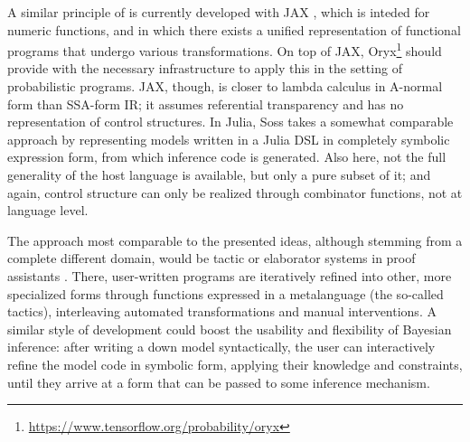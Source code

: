 A similar principle of is currently developed with JAX \parencite{bradbury2018jax}, which is inteded
for numeric functions, and in which there exists a unified representation of functional programs
that undergo various transformations.  On top of JAX,
Oryx\footnote{\protect\url{https://www.tensorflow.org/probability/oryx}} should provide with the
necessary infrastructure to apply this in the setting of probabilistic programs.  JAX, though, is
closer to lambda calculus in A-normal form than SSA-form IR; it assumes referential transparency and
has no representation of control structures.  In Julia, Soss \parencite{scherrer2019soss} takes a
somewhat comparable approach by representing models written in a Julia DSL in completely symbolic
expression form, from which inference code is generated.  Also here, not the full generality of the
host language is available, but only a pure subset of it; and again, control structure can only be
realized through combinator functions, not at language level.

The approach most comparable to the presented ideas, although stemming from a complete different
domain, would be tactic or elaborator systems in proof assistants
\parencite[e.g.,][]{brady2013idris,coqdevelopmentteam2020coq}.  There, user-written programs are
iteratively refined into other, more specialized forms through functions expressed in a metalanguage
(the so-called tactics), interleaving automated transformations and manual interventions.  A similar
style of development could boost the usability and flexibility of Bayesian inference: after writing
a down model syntactically, the user can interactively refine the model code in symbolic form,
applying their knowledge and constraints, until they arrive at a form that can be passed to some
inference mechanism.

